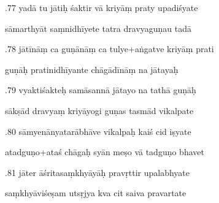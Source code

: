 \documentclass[article,12pt,a4paper]{memoir}%
\newcounter{parCount}
\begin{document}
	  
	  \pstart {}.77 yadā tu jātiḥ śaktir vā kriyāṃ praty upadiśyate 
	{}
	\pend%
      

	  
	  \pstart \leavevmode%
	sāmarthyāt saṃnidhīyete tatra dravyaguṇau tadā 
	{}
	\pend%
      

	  
	  \pstart {}.78 jātīnāṃ ca guṇānāṃ ca tulye+aṅgatve kriyāṃ prati 
	{}
	\pend%
      

	  
	  \pstart \leavevmode%
	guṇāḥ pratinidhīyante chāgādīnāṃ na jātayaḥ 
	{}
	\pend%
      

	  
	  \pstart {}.79 vyaktiśakteḥ samāsannā jātayo na tathā guṇāḥ 
	{}
	\pend%
      

	  
	  \pstart \leavevmode%
	sākṣād dravyaṃ kriyāyogi guṇas tasmād vikalpate 
	{}
	\pend%
      

	  
	  \pstart {}.80 sāmyenānyatarābhāve vikalpaḥ kaiś cid iṣyate 
	{}
	\pend%
      

	  
	  \pstart \leavevmode%
	atadguṇo+ataś chāgaḥ syān meṣo vā tadguṇo bhavet 
	{}
	\pend%
      

	  
	  \pstart {}.81 jāter āśritasaṃkhyāyāḥ pravṛttir upalabhyate 
	{}
	\pend%
      

	  
	  \pstart \leavevmode%
	saṃkhyāviśeṣam utsṛjya kva cit saiva pravartate 
	{}
	\pend%
      
\end{document}

